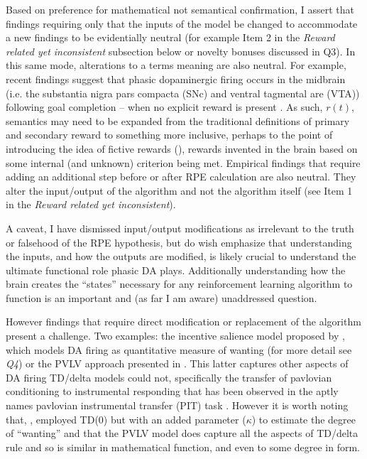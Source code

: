 \documentclass[doc]{apa}        %
\begin{document}
Based on preference for mathematical not semantical confirmation, I assert that findings requiring only that the inputs of the model be changed to accommodate a new findings to be evidentially neutral (for example Item 2 in the \emph{Reward related yet inconsistent} subsection below or novelty bonuses discussed in Q3). In this same mode, alterations to a terms meaning are also neutral.  For example, recent findings suggest that phasic dopaminergic firing occurs in the midbrain (i.e. the substantia nigra pars compacta (SNc) and ventral tagmental are (VTA)) following goal completion -- when no explicit reward is present \cite{Tricomi:2008p6663}.  As such, $r(t)$, semantics may need to be expanded from the traditional definitions of primary and secondary reward to something more inclusive, perhaps to the point of introducing the idea of fictive rewards (\cite{Lohrenz:2007p7240}), rewards invented in the brain based on some internal (and unknown) criterion being met.  Empirical findings that require adding an additional step before or after RPE calculation are also neutral.  They alter the input/output of the algorithm and not the algorithm itself (see Item 1 in the \emph{Reward related yet inconsistent}).  

A caveat, I have dismissed input/output modifications as irrelevant to the truth or falsehood of the RPE hypothesis, but do wish emphasize that understanding the inputs, and how the outputs are modified, is likely crucial to understand the ultimate functional role phasic DA plays.  Additionally understanding how the brain creates the ``states'' necessary for any reinforcement learning algorithm to function is an important and (as far I am aware) unaddressed question.  

However findings that require direct modification or replacement of the algorithm present a challenge.  Two examples: the incentive salience model proposed by , which models DA firing as quantitative measure of wanting (for more detail see \emph{Q4}) or the PVLV approach presented in .  This latter captures other aspects of DA firing TD/delta models could not, specifically the transfer of pavlovian conditioning to instrumental responding that has been observed in the aptly names pavlovian instrumental transfer (PIT) task \cite{Corbit:2007p6349}.  However it is worth noting that, , employed TD(0) but with an added parameter ($\kappa$) to estimate the degree of ``wanting'' and that the PVLV model does capture all the aspects of TD/delta rule and so is similar in mathematical function, and even to some degree in form. 
\end{document}
